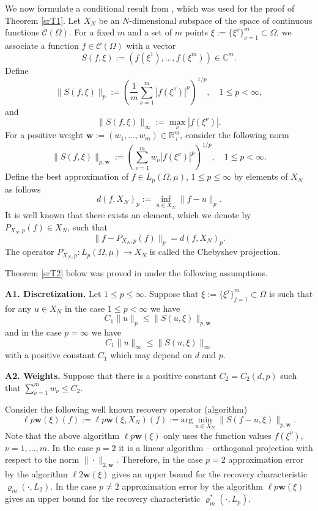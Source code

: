 \documentclass[12pt]{article}
\def\C{{\mathcal C}}
\def\R{{\mathbb R}}
\def\bbC{\mathbb C}
\def \ro{\varrho}
\def\bw{\mathbf w}
\numberwithin{equation}{section}
\begin{document}
We now formulate a conditional result from \cite{VT183}, which was used for the proof of Theorem \ref{srT1}. Let $X_N$ be an $N$-dimensional subspace of the space of continuous functions $\C(\Omega)$. For a fixed $m$ and a set of $m$  points  $\xi:=\{\xi^\nu\}_{\nu=1}^m\subset \Omega$,  we associate  a function $f\in \C(\Omega)$ with a vector
$$
S(f,\xi) := (f(\xi^1),\dots,f(\xi^m)) \in \bbC^m.
$$
Define
$$
\|S(f,\xi)\|_p:= \left(\frac{1}{m}\sum_{\nu=1}^m |f(\xi^\nu)|^p\right)^{1/p},\quad 1\le p<\infty,
$$
and 
$$
\|S(f,\xi)\|_\infty := \max_{\nu}|f(\xi^\nu)|.
$$
For a positive weight $\bw:=(w_1,\dots,w_m)\in \R_+^m$,  consider the following norm
$$
\|S(f,\xi)\|_{p,\bw}:= \left(\sum_{\nu=1}^m w_\nu |f(\xi^\nu)|^p\right)^{1/p},\quad 1\le p<\infty.
$$
Define the best approximation of $f\in L_p(\Omega,\mu)$, $1\le p\le \infty$ by elements of $X_N$ as follows
$$
d(f,X_N)_p := \inf_{u\in X_N} \|f-u\|_p.
$$
It is well known that there exists an element, which we denote by $P_{X_N,p}(f)\in X_N$, such that
$$
\|f-P_{X_N,p}(f)\|_p = d(f,X_N)_p.
$$
The operator $P_{X_N,p}: L_p(\Omega,\mu) \to X_N$ is called the Chebyshev projection. 

 Theorem \ref{srT2} below was proved in \cite{VT183} under the following assumptions.

{\bf A1. Discretization.} Let $1\le p\le \infty$. Suppose that $\xi:=\{\xi^j\}_{j=1}^m\subset \Omega$ is such that for any 
$u\in X_N$ in the case $1\le p<\infty$ we have
$$
C_1\|u\|_p \le \|S(u,\xi)\|_{p,\bw}  
$$
and in the case $p=\infty$ we have
$$
C_1\|u\|_\infty \le \|S(u,\xi)\|_{\infty}  
$$
with a positive constant $C_1$ which may depend on $d$ and $p$. 

{\bf A2. Weights.} Suppose that there is a positive constant $C_2=C_2(d,p)$ such that 
$\sum_{\nu=1}^m w_\nu \le C_2$.

Consider the following well known recovery operator (algorithm) 
$$
\ell p\bw(\xi)(f) := \ell p\bw(\xi,X_N)(f):=\text{arg}\min_{u\in X_N} \|S(f-u,\xi)\|_{p,\bw}.
$$
Note that the above algorithm $\ell p\bw(\xi)$ only uses the function values $f(\xi^\nu)$, $\nu=1,\dots,m$. In the case $p=2$ it is a linear algorithm -- orthogonal projection with respect 
to the norm $\|\cdot\|_{2,\bw}$. Therefore, in the case $p=2$ approximation error by the algorithm $\ell 2\bw(\xi)$ gives an upper bound for the recovery characteristic $\ro_m(\cdot, L_2)$. In the case $p\neq 2$ approximation error by the algorithm $\ell p\bw(\xi)$ gives an upper bound for the recovery characteristic $\ro_m^*(\cdot, L_p)$.
\end{document}
